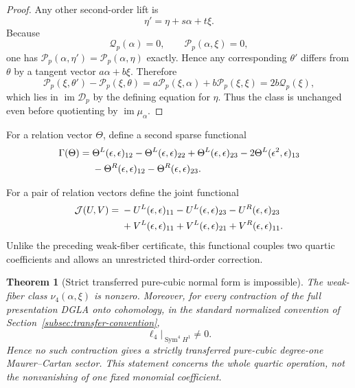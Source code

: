 \documentclass[11pt]{amsart}
\newtheorem{theorem}{Theorem}[section]
\newcommand{\cD}{\mathscr D}
\newcommand{\cQ}{\mathscr Q}
\newcommand{\cP}{\mathscr P}
\begin{document}
\begin{proof}
Any other second-order lift is
\[
\eta'=\eta+s\alpha+t\xi.
\]
Because
\[
\cQ_p(\alpha)=0,
\qquad
\cP_p(\alpha,\xi)=0,
\]
one has $\cP_p(\alpha,\eta')=\cP_p(\alpha,\eta)$ exactly.  Hence any corresponding $\theta'$ differs from $\theta$ by a tangent vector $a\alpha+b\xi$.  Therefore
\[
\cP_p(\xi,\theta')-\cP_p(\xi,\theta)
=
 a\cP_p(\xi,\alpha)+b\cP_p(\xi,\xi)
=
2b\cQ_p(\xi),
\]
which lies in $\operatorname{im}\cD_p$ by the defining equation for $\eta$.  Thus the class is unchanged even before quotienting by $\operatorname{im}\mu_\alpha$.
\end{proof}

For a relation vector $\Theta$, define a second sparse functional
\begin{align}\label{eq:quartic-certificate}
\Gamma(\Theta)
={}&
\Theta^L(\epsilon,\epsilon)_{12}
-\Theta^L(\epsilon,\epsilon)_{22}
+\Theta^L(\epsilon,\epsilon)_{23}
-2\Theta^L(\epsilon^2,\epsilon)_{13}\notag\\
&-\Theta^R(\epsilon,\epsilon)_{12}
-\Theta^R(\epsilon,\epsilon)_{23}.
\end{align}

For a pair of relation vectors define the joint functional
\begin{align}\label{eq:joint-quartic-certificate}
\mathcal J(U,V)={}&-U^L(\epsilon,\epsilon)_{11}
-U^L(\epsilon,\epsilon)_{23}-U^R(\epsilon,\epsilon)_{23}\notag\\
&+V^L(\epsilon,\epsilon)_{11}
+V^L(\epsilon,\epsilon)_{21}+V^R(\epsilon,\epsilon)_{11}.
\end{align}
Unlike the preceding weak-fiber certificate, this functional couples two
quartic coefficients and allows an unrestricted third-order correction.

\begin{theorem}[Strict transferred pure-cubic normal form is impossible]\label{thm:strict-transfer-no-go}
The weak-fiber class $\nu_4(\alpha,\xi)$ is nonzero. Moreover, for every
contraction of the full presentation DGLA onto cohomology, in the standard
normalized convention of Section~\ref{subsec:transfer-convention},
\[
\boxed{\ell_4\big|_{\operatorname{Sym}^4H^1}\ne0.}
\]
Hence no such contraction gives a strictly transferred pure-cubic
degree-one Maurer--Cartan sector. This statement concerns the whole quartic
operation, not the nonvanishing of one fixed monomial coefficient.
\end{theorem}
\end{document}
